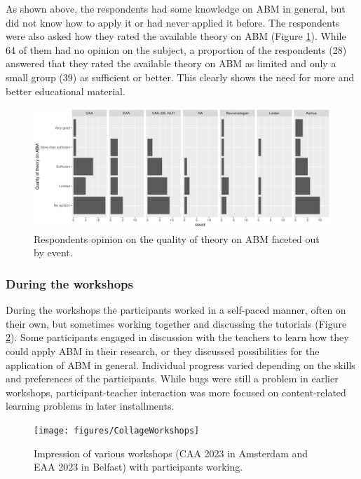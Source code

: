 \documentclass[
]{article}
\begin{document}
As shown above, the respondents had some knowledge on ABM in general, but did not know how to apply it or had never applied it before. The respondents were also asked how they rated the available theory on ABM (Figure \ref{fig:available-theory}). While 64 of them had no opinion on the subject, a proportion of the respondents (28) answered that they rated the available theory on ABM as limited and only a small group (39) as sufficient or better. This clearly shows the need for more and better educational material.

\begin{figure}
\centering
\includegraphics{paper_files/figure-latex/available-theory-1.pdf}
\caption{\label{fig:available-theory}Respondents opinion on the quality of theory on ABM faceted out by event.}
\end{figure}

\hypertarget{during-the-workshops}{%
\subsubsection{During the workshops}\label{during-the-workshops}}

During the workshops the participants worked in a self-paced manner, often on their own, but sometimes working together and discussing the tutorials (Figure \ref{fig:workshop-impression}). Some participants engaged in discussion with the teachers to learn how they could apply ABM in their research, or they discussed possibilities for the application of ABM in general. Individual progress varied depending on the skills and preferences of the participants. While bugs were still a problem in earlier workshops, participant-teacher interaction was more focused on content-related learning problems in later installments.

\begin{figure}
\texttt{[image: figures/CollageWorkshops]} \caption{Impression of various workshops (CAA 2023 in Amsterdam and EAA 2023 in Belfast) with participants working.}\label{fig:workshop-impression}
\end{figure}
\end{document}
